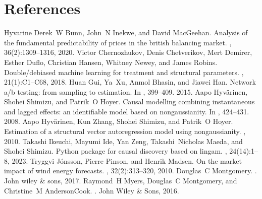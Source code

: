 \documentclass[letterpaper,10pt,english]{jupyterBook}
\begin{document}
\chapter{References}
\label{\detokenize{bibliography:references}}\label{\detokenize{bibliography::doc}}
\begin{sphinxthebibliography}{Hyvarine}
\sphinxAtStartPar
Derek W Bunn, John N Inekwe, and David MacGeehan. Analysis of the fundamental predictability of prices in the british balancing market. , 36(2):1309–1316, 2020.
\sphinxAtStartPar
Victor Chernozhukov, Denis Chetverikov, Mert Demirer, Esther Duflo, Christian Hansen, Whitney Newey, and James Robins. Double/debiased machine learning for treatment and structural parameters. , 21(1):C1–C68, 2018.
\sphinxAtStartPar
Huan Gui, Ya Xu, Anmol Bhasin, and Jiawei Han. Network a/b testing: from sampling to estimation. In , 399–409. 2015.
\sphinxAtStartPar
Aapo Hyvärinen, Shohei Shimizu, and Patrik O Hoyer. Causal modelling combining instantaneous and lagged effects: an identifiable model based on non\sphinxhyphen{}gaussianity. In , 424–431. 2008.
\sphinxAtStartPar
Aapo Hyvärinen, Kun Zhang, Shohei Shimizu, and Patrik O Hoyer. Estimation of a structural vector autoregression model using non\sphinxhyphen{}gaussianity. , 2010.
\sphinxAtStartPar
Takashi Ikeuchi, Mayumi Ide, Yan Zeng, Takashi Nicholas Maeda, and Shohei Shimizu. Python package for causal discovery based on lingam. , 24(14):1–8, 2023.
\sphinxAtStartPar
Tryggvi Jónsson, Pierre Pinson, and Henrik Madsen. On the market impact of wind energy forecasts. , 32(2):313–320, 2010.
\sphinxAtStartPar
Douglas C Montgomery. . John wiley \& sons, 2017.
\sphinxAtStartPar
Raymond H Myers, Douglas C Montgomery, and Christine M Anderson\sphinxhyphen{}Cook. . John Wiley \& Sons, 2016.

\end{sphinxthebibliography}
\end{document}
